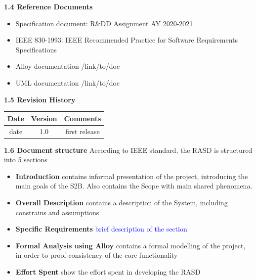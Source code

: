 \documentclass[a4paper, 10pt, oneside]{article}
\newcommand{\giovanni}[1]{\textcolor{Blue}{#1}}
\begin{document}
{\large \textbf{1.4 Reference Documents}}
\begin{itemize}
    \item Specification document: R\&DD Assignment AY 2020-2021
    \item IEEE 830-1993: IEEE Recommended Practice for Software Requirements Specifications
    \item Alloy documentation /link/to/doc
    \item UML documentation /link/to/doc
\end{itemize}
{\large \textbf{1.5 Revision History}}
\begin{center}
 \begin{tabular}{||c c c||}
 \hline
 Date & Version & Comments \\ [0.5ex] 
 \hline\hline
 date & 1.0 & first release \\ 
 \hline
 \hline
\end{tabular}
\end{center}
{\large \textbf{1.6 Document structure}} \newline
\newline
According to IEEE standard, the RASD is structured into 5 sections
\begin{itemize}
    \item \textbf{Introduction} contains informal presentation of the project, introducing the main goals of the S2B. Also contains the Scope with main shared phenomena.
    \item \textbf{Overall Description} contains a description of the System, including constrains and assumptions
    \item \textbf{Specific Requirements} \giovanni{brief description of the section}
    \item \textbf{Formal Analysis using Alloy} contains a formal modelling of the project, in order to proof consistency of the core functionality 
    \item \textbf{Effort Spent} show the effort spent in developing the RASD
\end{itemize}
\end{document}

